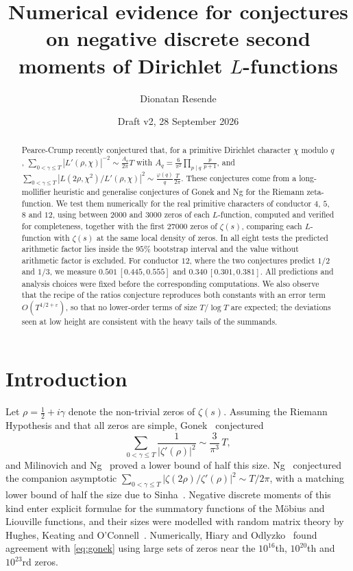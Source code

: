 \documentclass[11pt]{amsart}
\title[Numerical evidence for negative discrete moments of Dirichlet $L$-functions]{Numerical evidence for conjectures on negative discrete second moments of Dirichlet $L$-functions}
\author{Dionatan Resende}
\date{Draft v2, 28 September 2026}
\newcommand{\Lp}{L'}
\begin{document}
\begin{abstract}
Pearce-Crump recently conjectured that, for a primitive Dirichlet character $\chi$ modulo $q$,
$\sum_{0<\gamma\le T}|\Lp(\rho,\chi)|^{-2}\sim \frac{A_q}{2\pi}T$ with
$A_q=\frac{6}{\pi^2}\prod_{p\mid q}\frac{p}{p+1}$, and
$\sum_{0<\gamma\le T}|L(2\rho,\chi^2)/\Lp(\rho,\chi)|^{2}\sim\frac{\varphi(q)}{q}\frac{T}{2\pi}$.
These conjectures come from a long-mollifier heuristic and generalise conjectures of Gonek and Ng for the Riemann
zeta-function. We test them numerically for the real primitive characters of conductor $4$, $5$, $8$ and $12$, using
between $2000$ and $3000$ zeros of each $L$-function, computed and verified for completeness, together with the first
$27000$ zeros of $\zeta(s)$, comparing each $L$-function with $\zeta(s)$ at the same local density of zeros. In all
eight tests the predicted arithmetic factor lies inside the $95\%$ bootstrap interval and the value without arithmetic
factor is excluded. For conductor $12$, where the two conjectures predict $1/2$ and $1/3$, we measure
$0.501\,[0.445,0.555]$ and $0.340\,[0.301,0.381]$. All predictions and analysis choices were fixed before the
corresponding computations. We also observe that the recipe of the ratios conjecture reproduces both constants with an
error term $O(T^{1/2+\varepsilon})$, so that no lower-order terms of size $T/\log T$ are expected; the deviations seen at
low height are consistent with the heavy tails of the summands.
\end{abstract}

\maketitle

\section{Introduction}

Let $\rho=\tfrac12+i\gamma$ denote the non-trivial zeros of $\zeta(s)$. Assuming the Riemann Hypothesis and that all
zeros are simple, Gonek~\cite{Gonek} conjectured
\begin{equation}\label{eq:gonek}
\sum_{0<\gamma\le T}\frac{1}{|\zeta'(\rho)|^{2}}\sim\frac{3}{\pi^{3}}\,T,
\end{equation}
and Milinovich and Ng~\cite{MN} proved a lower bound of half this size. Ng~\cite{Ng} conjectured the companion asymptotic
$\sum_{0<\gamma\le T}|\zeta(2\rho)/\zeta'(\rho)|^{2}\sim T/2\pi$, with a matching lower bound of half the size due to
Sinha~\cite{Sinha}. Negative discrete moments of this kind enter explicit formulae for the summatory functions of the
M\"obius and Liouville functions, and their sizes were modelled with random matrix theory by Hughes, Keating and
O'Connell~\cite{HKO}. Numerically, Hiary and Odlyzko~\cite{HO} found agreement with \eqref{eq:gonek} using large sets
of zeros near the $10^{16}$th, $10^{20}$th and $10^{23}$rd zeros.
\end{document}
